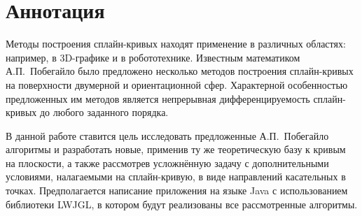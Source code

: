 \chapter*{Аннотация}

Методы построения сплайн-кривых находят применение в различных областях: например, в 3D-графике и в робототехнике.
Известным математиком А.П.~Побегайло было предложено несколько методов построения сплайн-кривых на поверхности
двумерной и ориентационной сфер. Характерной особенностью предложенных им методов является непрерывная
дифференцируемость сплайн-кривых до любого заданного порядка.

В данной работе ставится цель исследовать предложенные А.П.~Побегайло алгоритмы и разработать новые, применив ту же
теоретическую базу к кривым на плоскости, а также рассмотрев усложнённую задачу с дополнительными условиями,
налагаемыми на сплайн-кривую, в виде направлений касательных в точках. Предполагается написание приложения на языке
Java с использованием библиотеки LWJGL, в котором будут реализованы все рассмотренные алгоритмы.
